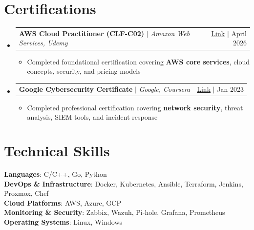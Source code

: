 \documentclass[letterpaper,11pt]{article}
\makeatletter
\newcommand{\resumeItem}[1]{
  \item\small{{#1 \vspace{-2pt}}}
}
\newcommand{\resumeProjectHeading}[2]{
    \item
    \begin{tabular*}{0.97\textwidth}{l@{\extracolsep{\fill}}r}
      \small#1 & #2 \\
    \end{tabular*}\vspace{-7pt}
}
\newcommand{\resumeSubHeadingListStart}{\begin{itemize}[leftmargin=0.15in, label={}]}
\newcommand{\resumeSubHeadingListEnd}{\end{itemize}}
\newcommand{\resumeItemListStart}{\begin{itemize}}
\newcommand{\resumeItemListEnd}{\end{itemize}\vspace{-5pt}}
\makeatother
\begin{document}
\section{Certifications}
    \resumeSubHeadingListStart
        \resumeProjectHeading
            {\textbf{AWS Cloud Practitioner (CLF-C02)} $|$ \emph{Amazon Web Services, Udemy}}{\href{https://www.credly.com/badges/16e29a40-4262-4768-9bae-9c7769fe84a7/public_url}{Link} $|$ April 2026}
            \resumeItemListStart
                \resumeItem{Completed foundational certification covering \textbf{AWS core services}, cloud concepts, security, and pricing models}
            \resumeItemListEnd
        \resumeProjectHeading
            {\textbf{Google Cybersecurity Certificate} $|$ \emph{Google, Coursera}}{\href{https://www.credly.com/badges/81c78d5d-02ce-40f2-b0c7-923a9c7ede4f/public_url}{Link} $|$ Jan 2023}
            \resumeItemListStart
                \resumeItem{Completed professional certification covering \textbf{network security}, threat analysis, SIEM tools, and incident response}
            \resumeItemListEnd
    \resumeSubHeadingListEnd

\section{Technical Skills}
 \begin{itemize}[leftmargin=0.15in, label={}]
    \small{\item{
     \textbf{Languages}{: C/C++, Go, Python} \\
     \textbf{DevOps \& Infrastructure}{: Docker, Kubernetes, Ansible, Terraform, Jenkins, Proxmox, Chef} \\
     \textbf{Cloud Platforms}{: AWS, Azure, GCP} \\
     \textbf{Monitoring \& Security}{: Zabbix, Wazuh, Pi-hole, Grafana, Prometheus} \\
     \textbf{Operating Systems}{: Linux, Windows} \\
    }}
 \end{itemize}

\end{document}

